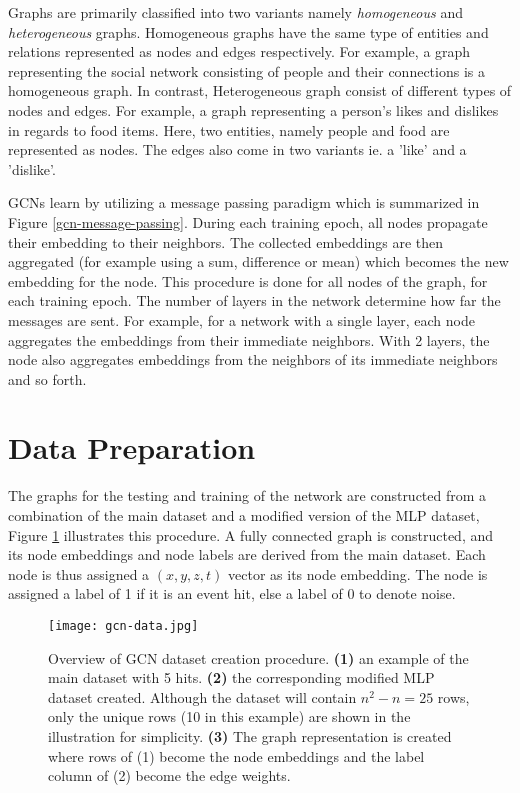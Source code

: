 Graphs are primarily classified into two variants namely
\emph{homogeneous} and \emph{heterogeneous} graphs. Homogeneous graphs
have the same type of entities and relations represented as nodes and
edges respectively. For example, a graph representing the social
network consisting of people and their connections is a homogeneous
graph. In contrast, Heterogeneous graph consist of different types of
nodes and edges. For example, a graph representing a person's likes
and dislikes in regards to food items. Here, two entities, namely
people and food are represented as nodes. The edges also come in two
variants ie. a 'like' and a 'dislike'.

GCNs learn by utilizing a message passing paradigm which is summarized
in Figure \ref{gcn-message-passing}. During each training epoch, all
nodes propagate their embedding to their neighbors. The collected
embeddings are then aggregated (for example using a sum, difference or
mean) which becomes the new embedding for the node. This procedure is
done for all nodes of the graph, for each training epoch. The number
of layers in the network determine how far the messages are sent. For
example, for a network with a single layer, each node aggregates the
embeddings from their immediate neighbors. With 2 layers, the node
also aggregates embeddings from the neighbors of its immediate
neighbors and so forth.

\section{Data Preparation}
\label{sec:gcn-data-prep}

The graphs for the testing and training of the network are constructed
from a combination of the main dataset and a modified version of the
MLP dataset, Figure \ref{fig:gcn-data} illustrates this procedure. A
fully connected graph is constructed, and its node embeddings and node
labels are derived from the main dataset. Each node is thus assigned a
$(x,y,z,t)$ vector as its node embedding. The node is assigned a label
of 1 if it is an event hit, else a label of 0 to denote noise.

\begin{figure}[htb]
  \centering
  \texttt{[image: gcn-data.jpg]}
  \caption{Overview of GCN dataset creation procedure. \textbf{(1)} an
    example of the main dataset with 5 hits. \textbf{(2)} the
    corresponding modified MLP dataset created. Although the dataset
    will contain $n^{2}-n = 25$ rows, only the unique rows (10 in this
    example) are shown in the illustration for simplicity.
    \textbf{(3)} The graph representation is created where rows of (1)
    become the node embeddings and the label column of (2) become the
    edge weights.}
  \label{fig:gcn-data}
\end{figure}

